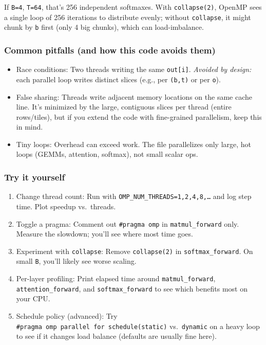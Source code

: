 \documentclass[
  letterpaper,
  DIV=11,
  numbers=noendperiod]{scrreprt}
\providecommand{\tightlist}{%
  \setlength{\itemsep}{0pt}\setlength{\parskip}{0pt}}
\begin{document}
If \texttt{B=4}, \texttt{T=64}, that's 256 independent softmaxes. With
\texttt{collapse(2)}, OpenMP sees a single loop of 256 iterations to
distribute evenly; without \texttt{collapse}, it might chunk by
\texttt{b} first (only 4 big chunks), which can load-imbalance.

\subsubsection{Common pitfalls (and how this code avoids
them)}\label{common-pitfalls-and-how-this-code-avoids-them}

\begin{itemize}
\item
  Race conditions: Two threads writing the same \texttt{out{[}i{]}}.
  \emph{Avoided by design:} each parallel loop writes distinct slices
  (e.g., per \texttt{(b,t)} or per \texttt{o}).
\item
  False sharing: Threads write adjacent memory locations on the same
  cache line. It's minimized by the large, contiguous slices per thread
  (entire rows/tiles), but if you extend the code with fine-grained
  parallelism, keep this in mind.
\item
  Tiny loops: Overhead can exceed work. The file parallelizes only
  large, hot loops (GEMMs, attention, softmax), not small scalar ops.
\end{itemize}

\subsubsection{Try it yourself}\label{try-it-yourself-28}

\begin{enumerate}
\def\labelenumi{\arabic{enumi}.}
\tightlist
\item
  Change thread count: Run with \texttt{OMP\_NUM\_THREADS=1,2,4,8,…} and
  log step time. Plot speedup vs.~threads.
\item
  Toggle a pragma: Comment out \texttt{\#pragma\ omp} in
  \texttt{matmul\_forward} only. Measure the slowdown; you'll see where
  most time goes.
\item
  Experiment with \texttt{collapse}: Remove \texttt{collapse(2)} in
  \texttt{softmax\_forward}. On small \texttt{B}, you'll likely see
  worse scaling.
\item
  Per-layer profiling: Print elapsed time around
  \texttt{matmul\_forward}, \texttt{attention\_forward}, and
  \texttt{softmax\_forward} to see which benefits most on your CPU.
\item
  Schedule policy (advanced): Try
  \texttt{\#pragma\ omp\ parallel\ for\ schedule(static)}
  vs.~\texttt{dynamic} on a heavy loop to see if it changes load balance
  (defaults are usually fine here).
\end{enumerate}
\end{document}
